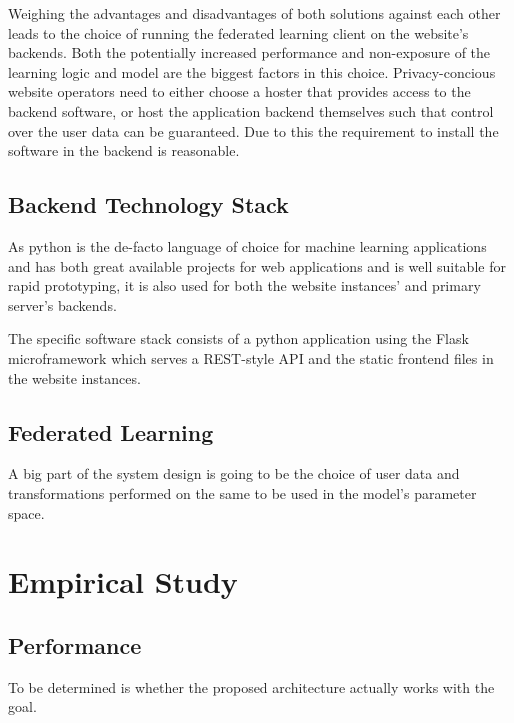 \documentclass[
    fontsize=12pt,
    headings=small,
    parskip=half,           %
    bibliography=totoc,
    numbers=noenddot,       %
    open=any,               %
    ]{scrreprt}
\begin{document}
Weighing the advantages and disadvantages of both solutions against each other leads to the choice of running the federated learning client on the website's backends. Both the potentially increased performance and non-exposure of the learning logic and model are the biggest factors in this choice. Privacy-concious website operators need to either choose a hoster that provides access to the backend software, or host the application backend themselves such that control over the user data can be guaranteed. Due to this the requirement to install the software in the backend is reasonable.

\section{Backend Technology Stack}

As python is the de-facto language of choice for machine learning applications and has both great available projects for web applications and is well suitable for rapid prototyping, it is also used for both the website instances' and primary server's backends.

The specific software stack consists of a python application using the Flask microframework which serves a REST-style API and the static frontend files in the website instances.


\section{Federated Learning}

A big part of the system design is going to be the choice of user data and transformations performed on the same to be used in the model's parameter space.


\chapter{Empirical Study}

\section{Performance}

To be determined is whether the proposed architecture actually works with the goal.



\begin{raggedright}
  \printbibliography
\end{raggedright}
\end{document}
